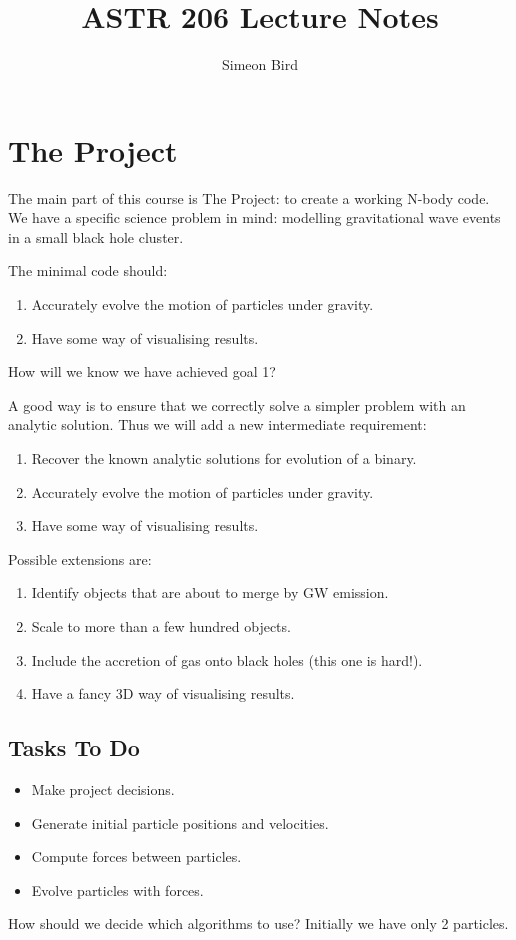 \documentclass[12pt]{article}
\title{ASTR 206 Lecture Notes}
\author{Simeon Bird}
\date{}
\begin{document}
\maketitle

\section{The Project}

The main part of this course is The Project: to create a working N-body code. We have a specific science problem in mind: modelling gravitational wave events in a small black hole cluster.

The minimal code should:

\begin{enumerate}
 \item Accurately evolve the motion of particles under gravity.
 \item Have some way of visualising results.
\end{enumerate}

How will we know we have achieved goal 1?

A good way is to ensure that we correctly solve a simpler problem with an analytic solution. Thus we will add a new intermediate requirement:

\begin{enumerate}
 \item Recover the known analytic solutions for evolution of a binary.
 \item Accurately evolve the motion of particles under gravity.
 \item Have some way of visualising results.
\end{enumerate}

Possible extensions are:

\begin{enumerate}
 \item Identify objects that are about to merge by GW emission.
 \item Scale to more than a few hundred objects.
 \item Include the accretion of gas onto black holes (this one is hard!).
 \item Have a fancy 3D way of visualising results.
\end{enumerate}


\subsection{Tasks To Do}

\begin{itemize}
 \item Make project decisions.
 \item Generate initial particle positions and velocities.
 \item Compute forces between particles.
 \item Evolve particles with forces.
\end{itemize}

How should we decide which algorithms to use? Initially we have only 2 particles.
\end{document}
